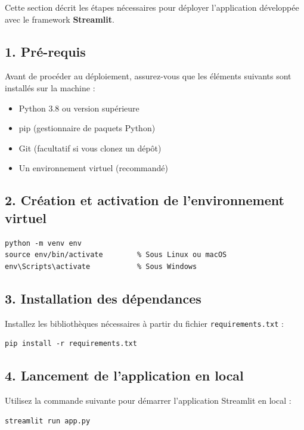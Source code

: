 Cette section décrit les étapes nécessaires pour déployer l'application développée avec le framework \textbf{Streamlit}.

\subsection{1. Pré-requis}

Avant de procéder au déploiement, assurez-vous que les éléments suivants sont installés sur la machine :

\begin{itemize}
  \item Python 3.8 ou version supérieure
  \item pip (gestionnaire de paquets Python)
  \item Git (facultatif si vous clonez un dépôt)
  \item Un environnement virtuel (recommandé)
\end{itemize}

\subsection{2. Création et activation de l'environnement virtuel}

\begin{verbatim}
python -m venv env
source env/bin/activate        % Sous Linux ou macOS
env\Scripts\activate           % Sous Windows
\end{verbatim}

\subsection{3. Installation des dépendances}

Installez les bibliothèques nécessaires à partir du fichier \texttt{requirements.txt} :

\begin{verbatim}
pip install -r requirements.txt
\end{verbatim}

\subsection{4. Lancement de l'application en local}

Utilisez la commande suivante pour démarrer l’application Streamlit en local :

\begin{verbatim}
streamlit run app.py
\end{verbatim}

